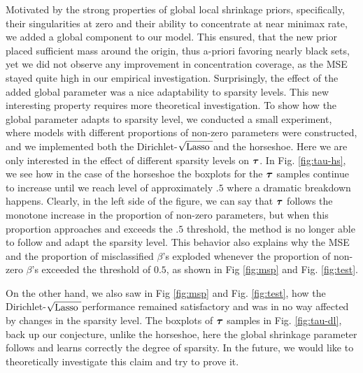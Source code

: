 \documentclass[ba]{imsart}
\def\sqdl{Dirichlet-$\sqrt{\text{\rm{Lasso} }}$}
\begin{document}
Motivated by the strong properties of global local shrinkage priors, specifically, their singularities at zero and their ability to concentrate at near minimax rate, we added a global component to our model. This ensured, that the new prior placed sufficient mass around the origin, thus a-priori favoring nearly black sets, yet we did not observe any improvement in concentration coverage, as the MSE stayed quite high in our empirical investigation. Surprisingly, the effect of the added global parameter was a nice adaptability to sparsity levels. This new interesting property requires more theoretical investigation. 
To show how the global parameter adapts to sparsity level, we conducted a small experiment, where models with different proportions of non-zero parameters were constructed, and we implemented both the \sqdl and the horseshoe. Here we are only interested in the effect of different sparsity levels on $\boldsymbol{\tau}$. In Fig. \ref{fig:tau-hs}, we see how in the case of the horseshoe the boxplots for the $\boldsymbol{\tau}$ samples continue to increase until we reach  level of approximately $.5$ where a dramatic breakdown happens. Clearly, in the left side of the figure, we can say that $\boldsymbol{\tau}$ follows the monotone increase in the proportion of non-zero parameters, but when this proportion approaches and exceeds the $.5$ threshold, the method is no longer able to follow and adapt the sparsity level. This behavior also explains why the MSE and the proportion of misclassified $\beta$'s exploded whenever the proportion of non-zero $\beta$'s exceeded the threshold of $0.5$, as shown in Fig \ref{fig:msp} and Fig. \ref{fig:test}.


On the other hand, we also saw in Fig \ref{fig:msp} and Fig. \ref{fig:test}, how the \sqdl performance remained satisfactory and was in no way affected by changes in the sparsity level. The boxplots of $\boldsymbol{\tau}$ samples in Fig. \ref{fig:tau-dl}, back up our conjecture, unlike the horseshoe, here the global shrinkage parameter follows and learns correctly the degree of sparsity. In the future, we would like to theoretically investigate this claim and try to prove it.
\end{document}
